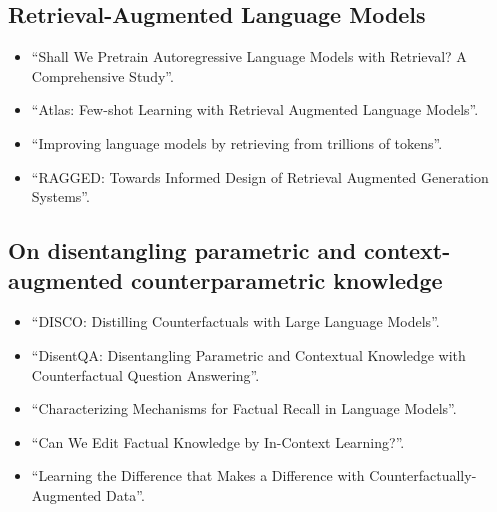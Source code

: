 \subsection{Retrieval-Augmented Language Models}
\begin{itemize}
	\item ``Shall We Pretrain Autoregressive Language Models with Retrieval? A Comprehensive Study''\cite{shall_we_pretrain_autoregressive}.
	\item ``Atlas: Few-shot Learning with Retrieval Augmented Language Models''\cite{atlas_foundational}.
	\item ``Improving language models by retrieving from trillions of tokens''\cite{retro}.
	\item ``RAGGED: Towards Informed Design of Retrieval Augmented Generation Systems''\cite{ragged}.
\end{itemize}

\subsection{On disentangling parametric and context-augmented counterparametric knowledge}
\begin{itemize}
	\item ``DISCO: Distilling Counterfactuals with Large Language Models''\cite{disco}.
	\item ``DisentQA: Disentangling Parametric and Contextual Knowledge with Counterfactual Question Answering''\cite{disentqa}.
	\item ``Characterizing Mechanisms for Factual Recall in Language Models''\cite{factual_recall}.
	\item ``Can We Edit Factual Knowledge by In-Context Learning?''\cite{can_we_edit_factual_knowledge}.
	\item ``Learning the Difference that Makes a Difference with Counterfactually-Augmented Data''\cite{learning_the_difference}.
\end{itemize}

